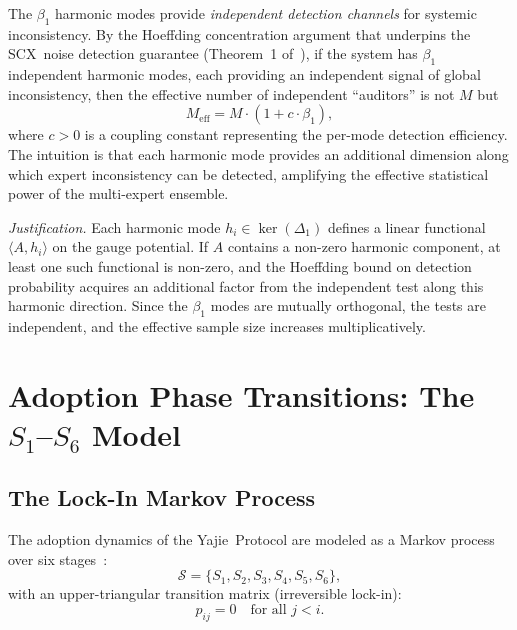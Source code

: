 \documentclass[12pt,a4paper]{article}
\theoremstyle{definition}
\theoremstyle{remark}
\theoremstyle{definition}
\newcommand{\SCX}{\textsf{SCX}}
\newcommand{\Yajie}{\textsf{Yajie}}
\DeclareMathOperator{\kerOp}{ker}
\begin{document}
The $\beta_1$ harmonic modes provide \emph{independent detection channels} for systemic inconsistency. By the Hoeffding concentration argument that underpins the \SCX\ noise detection guarantee (Theorem~1 of~\cite{scx_theory}), if the system has $\beta_1$ independent harmonic modes, each providing an independent signal of global inconsistency, then the effective number of independent ``auditors'' is not $M$ but
\begin{equation}\label{eq:M_eff}
  M_{\text{eff}} = M \cdot (1 + c \cdot \beta_1),
\end{equation}
where $c > 0$ is a coupling constant representing the per-mode detection efficiency. The intuition is that each harmonic mode provides an additional dimension along which expert inconsistency can be detected, amplifying the effective statistical power of the multi-expert ensemble.

\emph{Justification.} Each harmonic mode $h_i \in \kerOp(\Delta_1)$ defines a linear functional $\langle A, h_i\rangle$ on the gauge potential. If $A$ contains a non-zero harmonic component, at least one such functional is non-zero, and the Hoeffding bound on detection probability acquires an additional factor from the independent test along this harmonic direction. Since the $\beta_1$ modes are mutually orthogonal, the tests are independent, and the effective sample size increases multiplicatively.

\section{Adoption Phase Transitions: The \texorpdfstring{$S_1$--$S_6$}{S1--S6} Model}

\subsection{The Lock-In Markov Process}

The adoption dynamics of the \Yajie\ Protocol are modeled as a Markov process over six stages~\cite{yajie_protocol}:
\begin{equation}
  \mathcal{S} = \{S_1, S_2, S_3, S_4, S_5, S_6\},
\end{equation}
with an upper-triangular transition matrix (irreversible lock-in):
\begin{equation}
  p_{ij} = 0 \quad \text{for all } j < i.
\end{equation}
\end{document}
